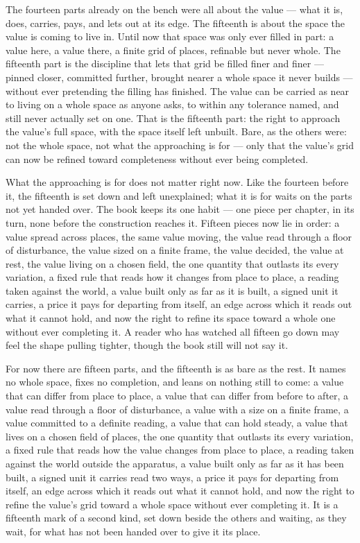 The fourteen parts already on the bench were all about the value --- what it is, does, carries, pays, and lets out at its edge. The fifteenth is about the space the value is coming to live in. Until now that space was only ever filled in part: a value here, a value there, a finite grid of places, refinable but never whole. The fifteenth part is the discipline that lets that grid be filled finer and finer --- pinned closer, committed further, brought nearer a whole space it never builds --- without ever pretending the filling has finished. The value can be carried as near to living on a whole space as anyone asks, to within any tolerance named, and still never actually set on one. That is the fifteenth part: the right to approach the value's full space, with the space itself left unbuilt. Bare, as the others were: not the whole space, not what the approaching is for --- only that the value's grid can now be refined toward completeness without ever being completed.

What the approaching is for does not matter right now. Like the fourteen before it, the fifteenth is set down and left unexplained; what it is for waits on the parts not yet handed over. The book keeps its one habit --- one piece per chapter, in its turn, none before the construction reaches it. Fifteen pieces now lie in order: a value spread across places, the same value moving, the value read through a floor of disturbance, the value sized on a finite frame, the value decided, the value at rest, the value living on a chosen field, the one quantity that outlasts its every variation, a fixed rule that reads how it changes from place to place, a reading taken against the world, a value built only as far as it is built, a signed unit it carries, a price it pays for departing from itself, an edge across which it reads out what it cannot hold, and now the right to refine its space toward a whole one without ever completing it. A reader who has watched all fifteen go down may feel the shape pulling tighter, though the book still will not say it.

For now there are fifteen parts, and the fifteenth is as bare as the rest. It names no whole space, fixes no completion, and leans on nothing still to come: a value that can differ from place to place, a value that can differ from before to after, a value read through a floor of disturbance, a value with a size on a finite frame, a value committed to a definite reading, a value that can hold steady, a value that lives on a chosen field of places, the one quantity that outlasts its every variation, a fixed rule that reads how the value changes from place to place, a reading taken against the world outside the apparatus, a value built only as far as it has been built, a signed unit it carries read two ways, a price it pays for departing from itself, an edge across which it reads out what it cannot hold, and now the right to refine the value's grid toward a whole space without ever completing it. It is a fifteenth mark of a second kind, set down beside the others and waiting, as they wait, for what has not been handed over to give it its place.
